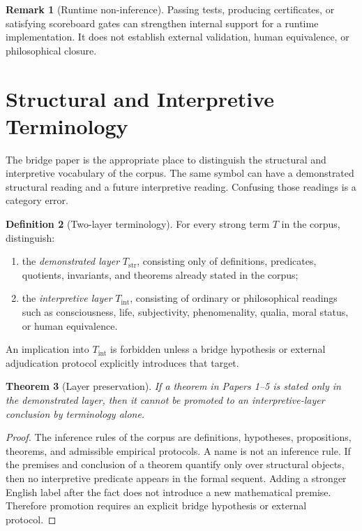 \documentclass[11pt,a4paper]{article}
\newtheorem{theorem}{Theorem}[section]
\theoremstyle{definition}
\newtheorem{definition}[theorem]{Definition}
\newtheorem{remark}[theorem]{Remark}
\begin{document}
\begin{remark}[Runtime non-inference]
Passing tests, producing certificates, or satisfying scoreboard gates can strengthen internal support for a runtime implementation. It does not establish external validation, human equivalence, or philosophical closure.
\end{remark}

\section{Structural and Interpretive Terminology}

The bridge paper is the appropriate place to distinguish the structural and interpretive vocabulary of
the corpus. The same symbol can have a demonstrated structural reading and a
future interpretive reading. Confusing those readings is a category error.

\begin{definition}[Two-layer terminology]\label{def:two-layer-terminology}
For every strong term $T$ in the corpus, distinguish:
\begin{enumerate}[leftmargin=1.5em]
\item the \emph{demonstrated layer} $T_{\mathrm{str}}$, consisting only of
definitions, predicates, quotients, invariants, and theorems already stated in
the corpus;
\item the \emph{interpretive layer} $T_{\mathrm{int}}$, consisting of ordinary
or philosophical readings such as consciousness, life, subjectivity,
phenomenality, qualia, moral status, or human equivalence.
\end{enumerate}
An implication into $T_{\mathrm{int}}$ is forbidden unless a bridge hypothesis
or external adjudication protocol explicitly introduces that target.
\end{definition}

\begin{theorem}[Layer preservation]\label{thm:layer-preservation}
If a theorem in Papers 1--5 is stated only in the demonstrated layer, then it
cannot be promoted to an interpretive-layer conclusion by terminology alone.
\end{theorem}

\begin{proof}
The inference rules of the corpus are definitions, hypotheses, propositions,
theorems, and admissible empirical protocols. A name is not an inference rule.
If the premises and conclusion of a theorem quantify only over structural
objects, then no interpretive predicate appears in the formal sequent. Adding a
stronger English label after the fact does not introduce a new mathematical
premise. Therefore promotion requires an explicit bridge hypothesis or external
protocol.
\end{proof}
\end{document}
